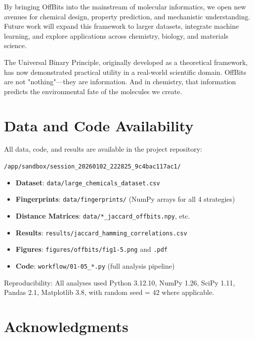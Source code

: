 \documentclass[11pt,letterpaper]{article}
\begin{document}
By bringing OffBits into the mainstream of molecular informatics, we open new avenues for chemical design, property prediction, and mechanistic understanding. Future work will expand this framework to larger datasets, integrate machine learning, and explore applications across chemistry, biology, and materials science.

The Universal Binary Principle, originally developed as a theoretical framework, has now demonstrated practical utility in a real-world scientific domain. OffBits are not "nothing"—they are information. And in chemistry, that information predicts the environmental fate of the molecules we create.

\section*{Data and Code Availability}

All data, code, and results are available in the project repository:

\texttt{/app/sandbox/session\_20260102\_222825\_9c4bac117ac1/}

\begin{itemize}
    \item \textbf{Dataset}: \texttt{data/large\_chemicals\_dataset.csv}
    \item \textbf{Fingerprints}: \texttt{data/fingerprints/} (NumPy arrays for all 4 strategies)
    \item \textbf{Distance Matrices}: \texttt{data/*\_jaccard\_offbits.npy}, etc.
    \item \textbf{Results}: \texttt{results/jaccard\_hamming\_correlations.csv}
    \item \textbf{Figures}: \texttt{figures/offbits/fig1-5.png} and \texttt{.pdf}
    \item \textbf{Code}: \texttt{workflow/01-05\_*.py} (full analysis pipeline)
\end{itemize}

Reproducibility: All analyses used Python 3.12.10, NumPy 1.26, SciPy 1.11, Pandas 2.1, Matplotlib 3.8, with random seed = 42 where applicable.

\section*{Acknowledgments}
\end{document}
